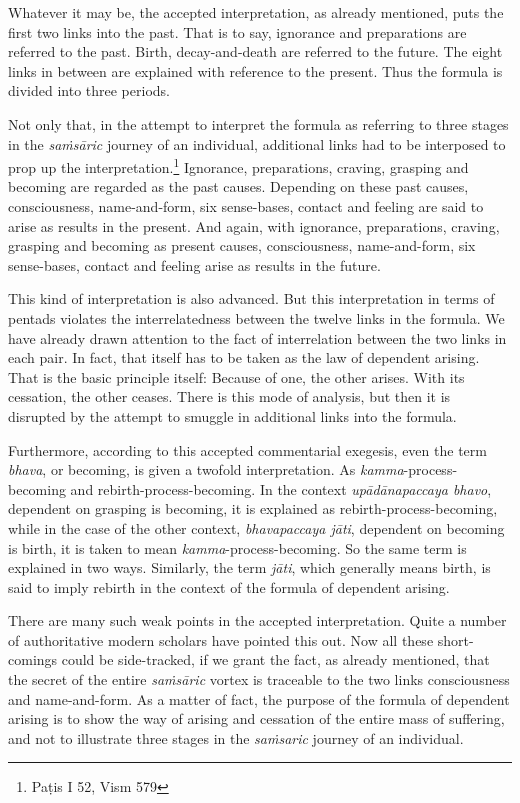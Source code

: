 Whatever it may be, the accepted interpretation, as already mentioned, puts the first two links into the past. That is to say, ignorance and preparations are referred to the past. Birth, decay-and-death are referred to the future. The eight links in between are explained with reference to the present. Thus the formula is divided into three periods.

Not only that, in the attempt to interpret the formula as referring to three stages in the \emph{saṁsāric} journey of an individual, additional links had to be interposed to prop up the interpretation.\footnote{Paṭis I 52, Vism 579} Ignorance, preparations, craving, grasping and becoming are regarded as the past causes. Depending on these past causes, consciousness, name-and-form, six sense-bases, contact and feeling are said to arise as results in the present. And again, with ignorance, preparations, craving, grasping and becoming as present causes, consciousness, name-and-form, six sense-bases, contact and feeling arise as results in the future.

This kind of interpretation is also advanced. But this interpretation in terms of pentads violates the interrelatedness between the twelve links in the formula. We have already drawn attention to the fact of interrelation between the two links in each pair. In fact, that itself has to be taken as the law of dependent arising. That is the basic principle itself: Because of one, the other arises. With its cessation, the other ceases. There is this mode of analysis, but then it is disrupted by the attempt to smuggle in additional links into the formula.

Furthermore, according to this accepted commentarial exegesis, even the term \emph{bhava}, or becoming, is given a twofold interpretation. As \emph{kamma}-process-becoming and rebirth-process-becoming. In the context \emph{upādānapaccaya bhavo}, dependent on grasping is becoming, it is explained as rebirth-process-becoming, while in the case of the other context, \emph{bhavapaccaya jāti}, dependent on becoming is birth, it is taken to mean \emph{kamma}-process-becoming. So the same term is explained in two ways. Similarly, the term \emph{jāti}, which generally means birth, is said to imply rebirth in the context of the formula of dependent arising.

There are many such weak points in the accepted interpretation. Quite a number of authoritative modern scholars have pointed this out. Now all these short-comings could be side-tracked, if we grant the fact, as already mentioned, that the secret of the entire \emph{saṁsāric} vortex is traceable to the two links consciousness and name-and-form. As a matter of fact, the purpose of the formula of dependent arising is to show the way of arising and cessation of the entire mass of suffering, and not to illustrate three stages in the \emph{saṁsaric} journey of an individual.

